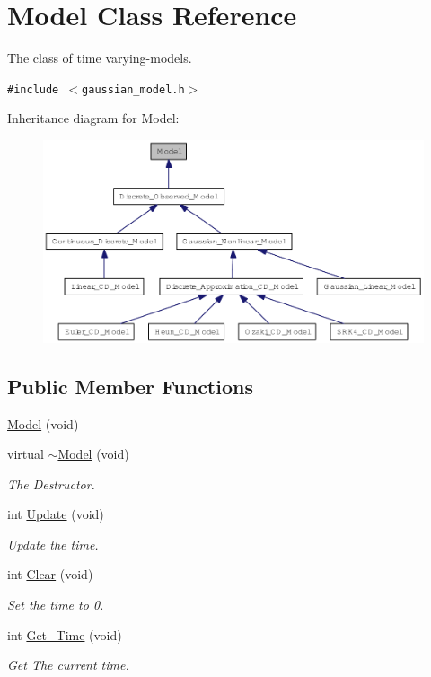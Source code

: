 \hypertarget{class_model}{
\section{Model Class Reference}
\label{class_model}
}
The class of time varying-models.  


{\tt \#include $<$gaussian\_\-model.h$>$}

Inheritance diagram for Model:\nopagebreak
\begin{figure}[H]
\begin{center}
\leavevmode
\includegraphics[width=400pt]{class_model__inherit__graph}
\end{center}
\end{figure}
\subsection*{Public Member Functions}
\begin{CompactItemize}
\item 
\hyperlink{class_model_a26cb9f39a3e0356152a57a2d2ecfaef}{Model} (void)
\item 
virtual \hyperlink{class_model_181e1dd7311fe966bf4f52c7feb592e4}{$\sim$Model} (void)
\begin{CompactList}\small\item\em The Destructor. \item\end{CompactList}\item 
int \hyperlink{class_model_e51159f212efa0af4b7c95a3d81e65db}{Update} (void)
\begin{CompactList}\small\item\em Update the time. \item\end{CompactList}\item 
int \hyperlink{class_model_fbf71c4ac9a04974625c7e1307e7d153}{Clear} (void)
\begin{CompactList}\small\item\em Set the time to 0. \item\end{CompactList}\item 
int \hyperlink{class_model_efbca8bb1098349a9c4c3ccfbba02aa2}{Get\_\-Time} (void)
\begin{CompactList}\small\item\em Get The current time. \item\end{CompactList}\end{CompactItemize}
